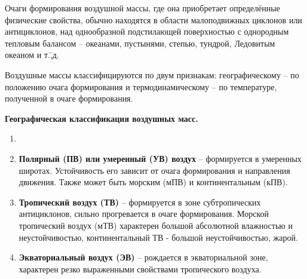 Очаги формирования воздушной массы, где она приобретает определённые
физические свойства, обычно находятся в области малоподвижных циклонов
или антициклонов, над однообразной подстилающей поверхностью с
однородным тепловым балансом \--- океанами, пустынями, степью,
тундрой, Ледовитым океаном и т.\=,д.

Воздушные массы классифицируются по двум признакам: географическому
\--- по положению очага формирования и термодинамическому \--- по
температуре, полученной в очаге формирования.

\textbf{Географическая классификация воздушных масс.}

\begin{enumerate}
\item {}
\item \textbf{Полярный (ПВ) или умеренный (УВ) воздух}
  \---
  формируется в умеренных широтах. Устойчивость его зависит от очага
  формирования и направления движения. Также может быть морским (мПВ)
  и континентальным (кПВ).
\item \textbf{Тропический воздух (ТВ)}
  \--- формируется в зоне
  субтропических антициклонов, сильно прогревается в очаге
  формирования. Морской тропический воздух (мТВ) характерен большой
  абсолютной влажностью и неустойчивостью, континентальный ТВ -
  большой неустойчивостью, жарой.
\item \textbf{Экваториальный воздух (ЭВ)}
  \--- рождается в
  экваториальной зоне, характерен резко выраженными свойствами
  тропического воздуха.
\end{enumerate}


